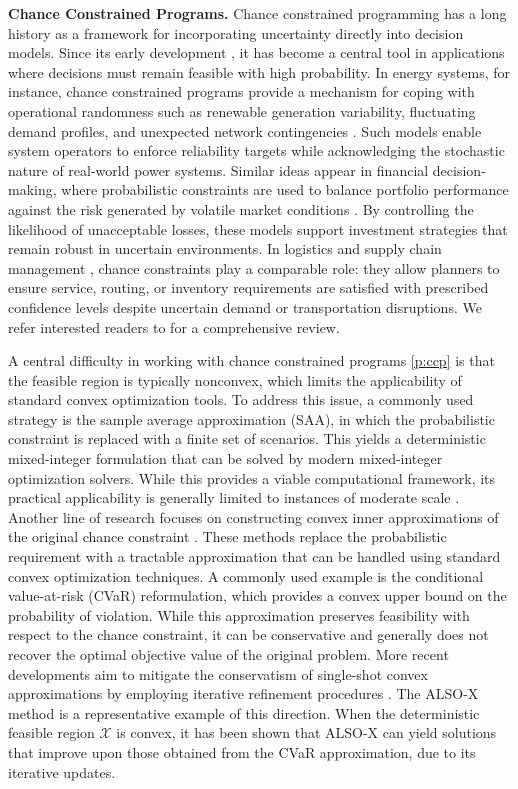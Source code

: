 \documentclass[11pt]{article}
\def\X{\mathcal{X}}
\begin{document}
\noindent\textbf{Chance Constrained Programs.}
Chance constrained programming has a long history as a framework for incorporating uncertainty directly into decision models. Since its early development \cite{charnes1958cost,charnes1963deterministic}, it has become a central tool in applications where decisions must remain feasible with high probability. In energy systems, for instance, chance constrained programs provide a mechanism for coping with operational randomness such as renewable generation variability, fluctuating demand profiles, and unexpected network contingencies \cite{cho2023exact,porras2024unifying}. Such models enable system operators to enforce reliability targets while acknowledging the stochastic nature of real-world power systems. Similar ideas appear in financial decision-making, where probabilistic constraints are used to balance portfolio performance against the risk generated by volatile market conditions \cite{deng2021scenario}. By controlling the likelihood of unacceptable losses, these models support investment strategies that remain robust in uncertain environments. In logistics and supply chain management \cite{dinh2018exact,ghosal2020distributionally}, chance constraints play a comparable role: they allow planners to ensure service, routing, or inventory requirements are satisfied with prescribed confidence levels despite uncertain demand or transportation disruptions. We refer interested readers to \cite{ahmed2008solving,kuccukyavuz2022chance} for a comprehensive review.

A central difficulty in working with chance constrained programs \eqref{p:ccp} is that the feasible region is typically nonconvex, which limits the applicability of standard convex optimization tools. To address this issue, a commonly used strategy is the sample average approximation (SAA), in which the probabilistic constraint is replaced with a finite set of scenarios. This yields a deterministic mixed-integer formulation that can be solved by modern mixed-integer optimization solvers. While this provides a viable computational framework, its practical applicability is generally limited to instances of moderate scale \cite{luedtke2008sample,ruszczynski2002probabilistic}. Another line of research focuses on constructing convex inner approximations of the original chance constraint \cite{nemirovski2007convex}. These methods replace the probabilistic requirement with a tractable approximation that can be handled using standard convex optimization techniques. A commonly used example is the conditional value-at-risk (CVaR) reformulation, which provides a convex upper bound on the probability of violation. While this approximation preserves feasibility with respect to the chance constraint, it can be conservative and generally does not recover the optimal objective value of the original problem.
More recent developments aim to mitigate the conservatism of single-shot convex approximations by employing iterative refinement procedures \cite{jiang2022also,jiang2025also}. The ALSO-X method is a representative example of this direction. When the deterministic feasible region $\X$ is convex, it has been shown that ALSO-X can yield solutions that improve upon those obtained from the CVaR approximation, due to its iterative updates. 
\end{document}
